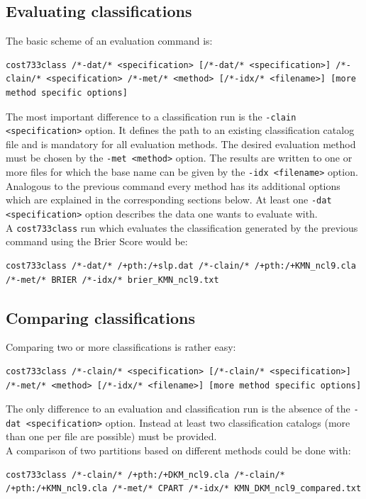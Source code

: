 \documentclass[12pt, oneside, a4paper, headsepline, plainheadsepline]{scrbook}
\begin{document}
\subsection{Evaluating classifications}
The basic scheme of an evaluation command is:
\begin{lstlisting}
cost733class /*-dat/* <specification> [/*-dat/* <specification>] /*-clain/* <specification> /*-met/* <method> [/*-idx/* <filename>] [more method specific options]
\end{lstlisting}
The most important difference to a classification run is the \verb+-clain <specification>+ option.
It defines the path to an existing classification catalog file and is mandatory for all evaluation methods.
The desired evaluation method must be chosen by the \verb+-met <method>+ option. The results are written to one or more files for which the base name can be given by the \verb+-idx <filename>+ option.
Analogous to the previous command every method has its additional 
options which are explained in the corresponding sections below. At least one \verb+-dat <specification>+ option describes the data one wants to evaluate with.\\
A \verb+cost733class+ run which evaluates the classification generated 
by the previous command using the Brier Score would be:
\begin{lstlisting}
cost733class /*-dat/* /+pth:/+slp.dat /*-clain/* /+pth:/+KMN_ncl9.cla /*-met/* BRIER /*-idx/* brier_KMN_ncl9.txt
\end{lstlisting}

\subsection{Comparing classifications}
Comparing two or more classifications is rather easy:
\begin{lstlisting}
cost733class /*-clain/* <specification> [/*-clain/* <specification>] /*-met/* <method> [/*-idx/* <filename>] [more method specific options]
\end{lstlisting}
The only difference to an evaluation and classification run is the 
absence of the 
\verb+-dat <specification>+ option. Instead at least two 
classification catalogs (more than one per file are possible) must be provided.\\
A comparison of two partitions based on different methods could be 
done with:
\begin{lstlisting}
cost733class /*-clain/* /+pth:/+DKM_ncl9.cla /*-clain/* /+pth:/+KMN_ncl9.cla /*-met/* CPART /*-idx/* KMN_DKM_ncl9_compared.txt
\end{lstlisting}
\end{document}

